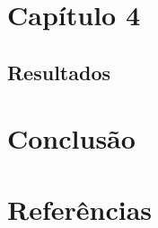 \documentclass[
  12pt,
  letterpaper,
  DIV=11,
  numbers=noendperiod]{scrreprt}
\begin{document}
\newpage

\chapter{Capítulo 4}\label{capuxedtulo-4}

\section{Resultados}\label{resultados}

\newpage

\chapter{Conclusão}\label{conclusuxe3o}

\chapter{Referências}\label{referuxeancias}
\end{document}
